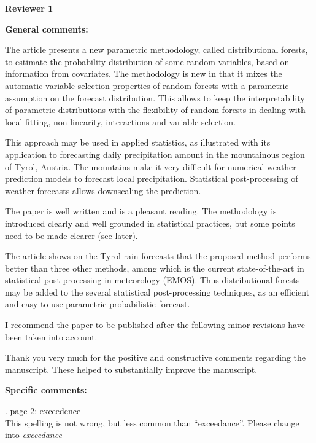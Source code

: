 \documentclass[american,foldmarks=false,noconfig]{uibklttr}
\newenvironment{review}{\fontshape{\itdefault}\fontseries{\bfdefault} \selectfont \smallskip}{\par}
\begin{document}
\newpage


\textbf{\LARGE Reviewer 1}

\bigskip

\textbf{General comments:}

\begin{review}
The article presents a new parametric methodology, called 
distributional forests, to estimate the probability 
distribution of some random variables, based on information 
from covariates. The methodology is new in that it mixes the
automatic variable selection properties of random forests 
with a parametric assumption on the forecast distribution. 
This allows to keep the interpretability of parametric 
distributions with the flexibility of random forests in 
dealing with local fitting, non-linearity, interactions 
and variable selection.

This approach may be used in applied statistics, as 
illustrated with its application to forecasting daily 
precipitation amount in the mountainous region of Tyrol, 
Austria. The mountains make it very difficult for numerical 
weather prediction models to forecast local precipitation. 
Statistical post-processing of weather forecasts allows 
downscaling the prediction.

The paper is well written and is a pleasant reading. 
The methodology is introduced clearly and well grounded 
in statistical practices, but some points need to be 
made clearer (see later).

The article shows on the Tyrol rain forecasts that the 
proposed method performs better than three other methods, 
among which is the current state-of-the-art in statistical 
post-processing in meteorology (EMOS). Thus distributional
forests may be added to the several statistical post-processing 
techniques, as an efficient and easy-to-use parametric 
probabilistic forecast.

I recommend the paper to be published after the following 
minor revisions have been taken into account.
\end{review}

Thank you very much for the positive and constructive 
comments regarding the manuscript. These helped to 
substantially improve the manuscript.

\bigskip

\textbf{Specific comments:}

\begin{review}
1. {\color{quotecolor} page 2: exceedence}\\
This spelling is not wrong, but less common than ``exceedance''.
Please change into \textit{exceedance}
\end{review}
\end{document}
